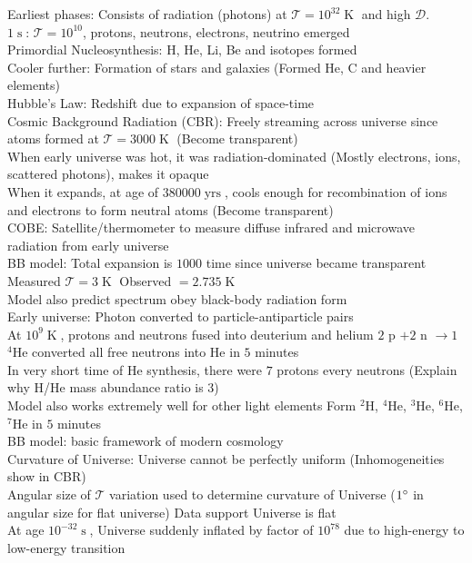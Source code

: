 \documentclass{article}
\DeclareMathOperator{\s}{s}
\DeclareMathOperator{\yrs}{yrs}
\DeclareMathOperator{\K}{K}
\begin{document}
Earliest phases: Consists of radiation (photons) at $\mathcal{T}=10^{32}\K$ and high $\mathcal{D}$. \\
$1\s$: $\mathcal{T}=10^{10}$, protons, neutrons, electrons, neutrino emerged\\
Primordial Nucleosynthesis: H, He, Li, Be and isotopes formed\\
Cooler further: Formation of stars and galaxies (Formed He, C and heavier elements)\\
Hubble's Law: Redshift due to expansion of space-time\\
Cosmic Background Radiation (CBR): Freely streaming across universe since atoms formed at $\mathcal{T}=3000\K$ (Become transparent)\\
When early universe was hot, it was radiation-dominated (Mostly electrons, ions, scattered photons), makes it opaque\\
When it expands, at age of $380000\yrs$, cools enough for recombination of ions and electrons to form neutral atoms (Become transparent)\\
COBE: Satellite/thermometer to measure diffuse infrared and microwave radiation from early universe\\
BB model: Total expansion is $1000$ time since universe became transparent \quad Measured $\mathcal{T}=3\K$ \quad Observed $=2.735\K$\\
Model also predict spectrum obey black-body radiation form\\
Early universe: Photon converted to particle-antiparticle pairs \\
At $10^{9}\K$, protons and neutrons fused into deuterium and helium \quad $2$ p $+2$ n $\rightarrow 1$ $^{4}$He \quad converted all free neutrons into He in $5$ minutes\\
In very short time of He synthesis, there were $7$ protons every neutrons (Explain why H/He mass abundance ratio is $3$)\\
Model also works extremely well for other light elements \quad Form $^{2}$H, $^{4}$He, $^{3}$He, $^{6}$He, $^{7}$He in $5$ minutes\\
BB model: basic framework of modern cosmology\\
Curvature of Universe: Universe cannot be perfectly uniform (Inhomogeneities show in CBR)\\
Angular size of $\mathcal{T}$ variation used to determine curvature of Universe ($1\degree$ in angular size for flat universe) Data support Universe is flat\\
At age $10^{-32}\s$, Universe suddenly inflated by factor of $10^{78}$ due to high-energy to low-energy transition\\
\end{document}
